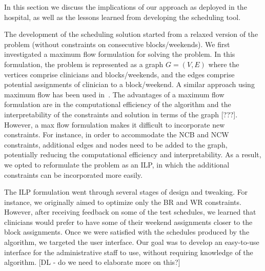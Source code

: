 In this section we discuss the implications of our approach as deployed in the hospital,
as well as the lessons learned from developing the scheduling tool.

The development of the scheduling solution started from a relaxed version of the problem
(without constraints on consecutive blocks/weekends).
We first investigated a maximum flow formulation for solving the problem.
In this formulation, the problem is represented as a graph $G=(V, E)$ where
the vertices comprise clinicians and blocks/weekends, and the edges comprise
potential assignments of clinician to a block/weekend.
A similar approach using maximum flow has been used in~\cite{brucker_personnel_2011, smet_polynomially_2016, el_adoly_new_2018, moz_integer_2003}.
The advantages of a maximum flow formulation are in the computational efficiency
of the algorithm and the interpretability of the constraints and solution in terms of the graph [???].
However, a max flow formulation makes it difficult to incorporate new constraints.
For instance, in order to accommodate the NCB and NCW constraints,
additional edges and nodes need to be added to the graph, potentially reducing 
the computational efficiency and interpretability.
As a result, we opted to reformulate the problem as an ILP, in which the additional constraints
can be incorporated more easily.

The ILP formulation went through several stages of design and tweaking.
For instance, we originally aimed to optimize only the BR and WR constraints.
However, after receiving feedback on some of the test schedules, we learned that 
clinicians would prefer to have some of their weekend assignments closer to the block assignments.
Once we were satisfied with the schedules produced by the algorithm, we targeted the
user interface. Our goal was to develop an easy-to-use interface for the administrative staff to use,
without requiring knowledge of the algorithm. [DL - do we need to elaborate more on this?]

